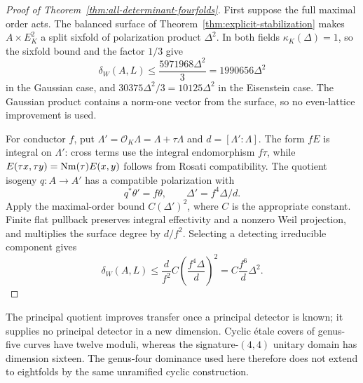 \begin{proof}[Proof of Theorem~\ref{thm:all-determinant-fourfolds}]
First suppose the full maximal order acts. The balanced surface of Theorem~\ref{thm:explicit-stabilization} makes $A\times E_K^2$ a split sixfold of polarization product $\Delta^2$. In both fields $\kappa_K(\Delta)=1$, so the sixfold bound and the factor $1/3$ give
\[
 \delta_W(A,L)\le\frac{5971968\Delta^2}{3}
 =1990656\Delta^2
\]
in the Gaussian case, and $30375\Delta^2/3=10125\Delta^2$ in the Eisenstein case. The Gaussian product contains a norm-one vector from the surface, so no even-lattice improvement is used.

For conductor $f$, put $\Lambda'=\mathcal O_K\Lambda=\Lambda+\tau\Lambda$ and $d=[\Lambda':\Lambda]$. The form $fE$ is integral on $\Lambda'$: cross terms use the integral endomorphism $f\tau$, while
$E(\tau x,\tau y)=\operatorname{Nm}(\tau)E(x,y)$ follows from Rosati compatibility. The quotient isogeny $q:A\to A'$ has a compatible polarization with
\[
 q^*\theta'=f\theta,
 \qquad \Delta'=f^4\Delta/d.
\]
Apply the maximal-order bound $C(\Delta')^2$, where $C$ is the appropriate constant. Finite flat pullback preserves integral effectivity and a nonzero Weil projection, and multiplies the surface degree by $d/f^2$. Selecting a detecting irreducible component gives
\[
 \delta_W(A,L)\le\frac d{f^2}C\left(\frac{f^4\Delta}{d}\right)^2
 =C\frac{f^6}{d}\Delta^2.
\]
\end{proof}

The principal quotient improves transfer once a principal detector is known; it supplies no principal detector in a new dimension. Cyclic \'etale covers of genus-five curves have twelve moduli, whereas the signature-$(4,4)$ unitary domain has dimension sixteen. The genus-four dominance used here therefore does not extend to eightfolds by the same unramified cyclic construction.
